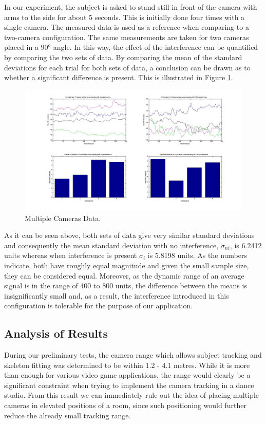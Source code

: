 \documentclass[11pt,a4paper]{article}
\begin{document}
\noindent
In our experiment, the subject is asked to stand still in front of the camera with arms to the side for about 5 seconds. This is initially done four times with a single camera. The measured data is used as a reference when comparing to a two-camera configuration. The same measurements are taken for two cameras placed in a $90^o$ angle. In this way, the effect of the interference can be quantified by comparing the two sets of data. By comparing the mean of the standard deviations for each trial for both sets of data, a conclusion can be drawn as to whether a significant difference is present. This is illustrated in Figure \ref{Multiple_Std}. 
 
\begin{figure}[H]
\centering
\includegraphics[scale=0.3]{Multiple_Cameras_Std.jpg}
\caption{Multiple Cameras Data.} %
\label{Multiple_Std}
\end{figure}

\noindent
As it can be seen above, both sets of data give very similar standard deviations and consequently the mean standard deviation with no interference, $\sigma_{ni}$, is 6.2412 units whereas when interference is present $\sigma_{i}$ is 5.8198 units. As the numbers indicate, both have roughly equal magnitude and given the small sample size, they can be considered equal. Moreover, as the dynamic range of an average signal is in the range of 400 to 800 units, the difference between the means is insignificantly small and, as a result, the interference introduced in this configuration is tolerable for the purpose of our application.

\subsection{Analysis of Results}
\noindent
During our preliminary tests, the camera range which allows subject tracking and skeleton fitting was determined to be within 1.2 - 4.1 metres. While it is more than enough for various video game applications, the range would clearly be a significant constraint when trying to implement the camera tracking in a dance studio. From this result we can immediately rule out the idea of placing multiple cameras in elevated positions of a room, since such positioning would further reduce the already small tracking range.
\end{document}
